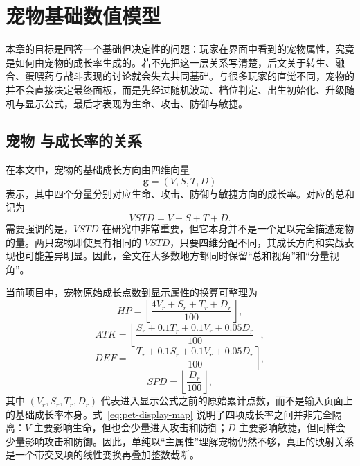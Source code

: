 \chapter{宠物基础数值模型}

本章的目标是回答一个基础但决定性的问題：玩家在界面中看到的宠物属性，究竟是如何由宠物的成长率生成的。若不先把这一层关系写清楚，后文关于转生、融合、蛋喂药与战斗表现的讨论就会失去共同基础。与很多玩家的直觉不同，宠物的 \vstd{} 并不会直接决定最终面板，而是先经过随机波动、档位判定、出生初始化、升级随机与显示公式，最后才表现为生命、攻击、防御与敏捷。

\section{宠物 \vstd{} 与成长率的关系}

在本文中，宠物的基础成长方向由四维向量
\begin{equation}
    \bm{g}=(V,S,T,D)
\end{equation}
表示，其中四个分量分别对应生命、攻击、防御与敏捷方向的成长率。对应的总和记为
\begin{equation}
    VSTD = V+S+T+D.
\end{equation}
需要强调的是，$VSTD$ 在研究中非常重要，但它本身并不是一个足以完全描述宠物的量。两只宠物即使具有相同的 $VSTD$，只要四维分配不同，其成长方向和实战表现也可能差异明显。因此，全文在大多数地方都同时保留“总和视角”和“分量视角”。

当前项目中，宠物原始成长点数到显示属性的换算可整理为
\begin{equation}
    HP = \left\lfloor \frac{4V_r + S_r + T_r + D_r}{100} \right\rfloor,
\end{equation}
\begin{equation}
    ATK = \left\lfloor \frac{S_r + 0.1T_r + 0.1V_r + 0.05D_r}{100} \right\rfloor,
\end{equation}
\begin{equation}
    DEF = \left\lfloor \frac{T_r + 0.1S_r + 0.1V_r + 0.05D_r}{100} \right\rfloor,
\end{equation}
\begin{equation}
    SPD = \left\lfloor \frac{D_r}{100} \right\rfloor,
    \label{eq:pet-display-map}
\end{equation}
其中 $(V_r,S_r,T_r,D_r)$ 代表进入显示公式之前的原始累计点数，而不是输入页面上的基础成长率本身。式~\eqref{eq:pet-display-map} 说明了四项成长率之间并非完全隔离：$V$ 主要影响生命，但也会少量进入攻击和防御；$D$ 主要影响敏捷，但同样会少量影响攻击和防御。因此，单纯以“主属性”理解宠物仍然不够，真正的映射关系是一个带交叉项的线性变换再叠加整数截断。

